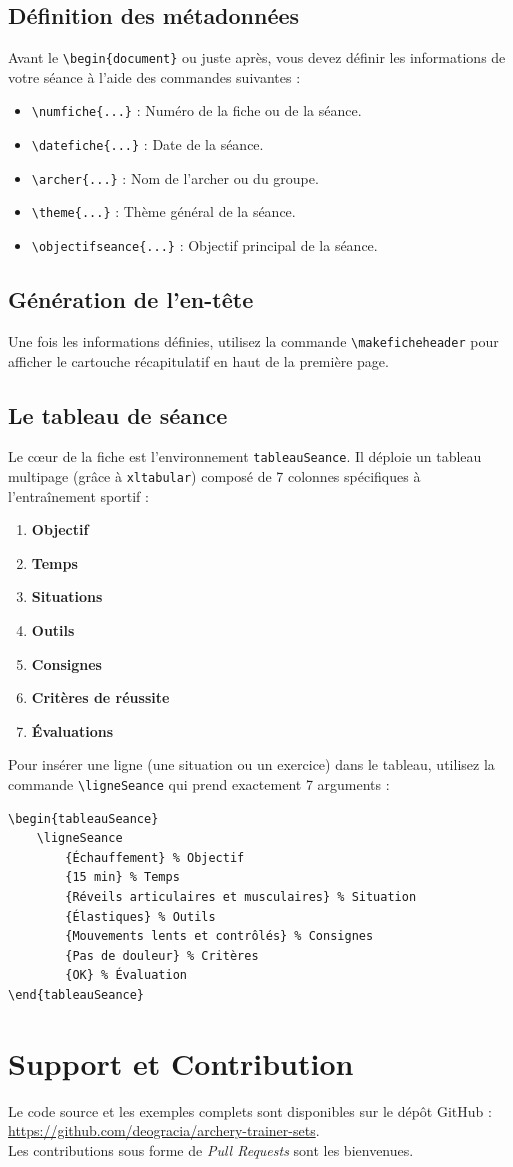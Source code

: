 \documentclass[a4paper,11pt]{article}
\begin{document}
\subsection{Définition des métadonnées}
Avant le \verb|\begin{document}| ou juste après, vous devez définir les informations de votre séance à l'aide des commandes suivantes :
\begin{itemize}
    \item \verb|\numfiche{...}| : Numéro de la fiche ou de la séance.
    \item \verb|\datefiche{...}| : Date de la séance.
    \item \verb|\archer{...}| : Nom de l'archer ou du groupe.
    \item \verb|\theme{...}| : Thème général de la séance.
    \item \verb|\objectifseance{...}| : Objectif principal de la séance.
\end{itemize}

\subsection{Génération de l'en-tête}
Une fois les informations définies, utilisez la commande \verb|\makeficheheader| pour afficher le cartouche récapitulatif en haut de la première page.

\subsection{Le tableau de séance}
Le cœur de la fiche est l'environnement \texttt{tableauSeance}. Il déploie un tableau multipage (grâce à \texttt{xltabular}) composé de 7 colonnes spécifiques à l'entraînement sportif :
\begin{enumerate}
    \item \textbf{Objectif}
    \item \textbf{Temps}
    \item \textbf{Situations}
    \item \textbf{Outils}
    \item \textbf{Consignes}
    \item \textbf{Critères de réussite}
    \item \textbf{Évaluations}
\end{enumerate}

Pour insérer une ligne (une situation ou un exercice) dans le tableau, utilisez la commande \verb|\ligneSeance| qui prend exactement 7 arguments :
\begin{lstlisting}
\begin{tableauSeance}
    \ligneSeance
        {Échauffement} % Objectif
        {15 min} % Temps
        {Réveils articulaires et musculaires} % Situation
        {Élastiques} % Outils
        {Mouvements lents et contrôlés} % Consignes
        {Pas de douleur} % Critères
        {OK} % Évaluation
\end{tableauSeance}
\end{lstlisting}

\section{Support et Contribution}
Le code source et les exemples complets sont disponibles sur le dépôt GitHub :\\ \url{https://github.com/deogracia/archery-trainer-sets}.\\
Les contributions sous forme de \textit{Pull Requests} sont les bienvenues.
\end{document}
